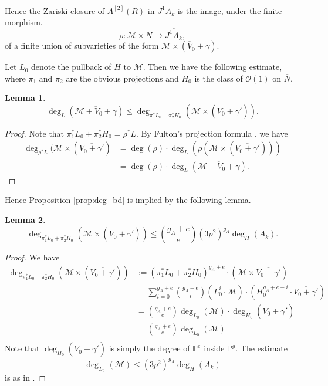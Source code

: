 \documentclass[11pt]{amsart}
\theoremstyle{plain}
\newtheorem{lemma}{Lemma}
\theoremstyle{definition}
\begin{document}
Hence the Zariski closure of $A^{[2]}(R)$ in $\overline{J^1 A_k }$ is the image, under the finite morphism.
\[
\rho :\mathcal{M}\times \overline{N}\to \overline{J^1 A_k },
\]
of a finite union of subvarieties of the form $\mathcal{M}\times (\overline{V}_0 +\gamma )$.

Let $L_0 $ denote the pullback of $H$ to $\mathcal{M}$. Then we have the following estimate, where $\pi _1 $ and $\pi _2 $ are the obvious projections and $H_0$ is the class of $\mathcal{O}(1)$ on $\overline{N}$.
\begin{lemma}
\[
\deg _L (\overline{\mathcal{M}+V_0+\gamma })\leq \deg _{\pi _1 ^* L_0 +\pi _2 ^* H_0 }(\mathcal{M}\times (\overline{V_0 +\gamma '})).
\]
\end{lemma}
\begin{proof}
Note that $\pi _1 ^* L_0 +\pi _2 ^* H_0 =\rho ^* L$. By Fulton's projection formula \cite[2.5(c)]{fulton}, we have
\begin{align*}
\deg _{\rho ^* L}(\mathcal{M}\times (\overline{V_0 +\gamma '}) & =\deg (\rho )\cdot \deg _L (\rho (\mathcal{M}\times (\overline{V_0 +\gamma '}))) \\
& = \deg (\rho )\cdot \deg _L (\overline{\mathcal{M}+V_0 +\gamma }).
\end{align*}
\end{proof}

Hence Proposition \ref{prop:deg_bd} is implied by the following lemma.
\begin{lemma}
\[
\deg _{\pi _1 ^* L_0 +\pi _2 ^* H_0 }(\mathcal{M}\times (\overline{V_0 +\gamma '}))\leq \binom{g_A +e}{e}(3p^2 )^{g_A} \deg _H (A_k ).
\]
\end{lemma}
\begin{proof}
We have 
\begin{align*}
\deg _{\pi _1 ^* L_0 +\pi _2 ^* H_0 }(\mathcal{M}\times (\overline{V_0 +\gamma '}))& := (\pi _1 ^* L_0 +\pi _2 ^* H_0 )^{g_A+e}\cdot (\mathcal{M}\times \overline{V_0 +\gamma '}) \\
& = \sum _{i=0}^{g_A +e}\binom{g_A +e }{i}(L_0 ^i \cdot \mathcal{M})\cdot (H_0 ^{g_A +e-i}\cdot \overline{V_0 +\gamma' }) \\
 & =\binom{g_A+e}{e}\deg _{L_0 }(\mathcal{M})\cdot \deg _{H_0 } (\overline{V_0 +\gamma '}) \\
& =\binom{g_A+e}{e}\deg _{L_0 }(\mathcal{M})\\
\end{align*}
Note that $\deg _{H_0 }(\overline{V_0 +\gamma '} )$ is simply the degree of $\mathbb{P}^e$ inside $\mathbb{P}^g$.
The estimate 
\[
\deg _{L_0 }(\mathcal{M})\leq (3p^2 )^{g_A} \deg _H (A_k ) 
\]
is as in \cite{buium:96}.
\end{proof}
\end{document}
